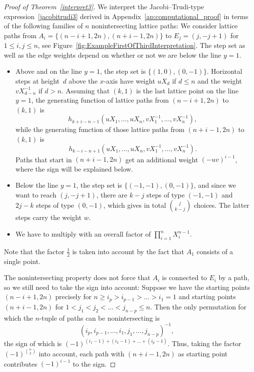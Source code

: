\documentclass[12pt]{amsart}
\theoremstyle{definition}
\numberwithin{equation}{section}
\begin{document}
\begin{proof}[Proof of Theorem~\ref{interpret3}]
	
	We interpret the Jacobi--Trudi-type expression~\eqref{jacobitrudi3} derived in Appendix~\ref{ap:computational_proof} in terms of the following families of $n$ nonintersecting lattice paths: We consider lattice paths from $A_i=\{(n-i+1,2n),(n+i-1,2n)\}$ to $E_j=(j,-j+1)$ for $1 \le i,j \le n$, see Figure~\ref{fig:ExampleFirstOfThirdInterpretation}. The step set as well as the edge weights depend on whether or not we are below the line $y=1$. 
	\begin{itemize} 
		\item Above and on the line $y=1$, the step set is $\{(1,0),(0,-1)\}$. Horizontal steps at height~$d$ above the $x$-axis have weight $u X_d$ if $d \le n$ and the weight $v X_{d-n}^{-1}$ if $d>n$. Assuming that $(k,1)$ is the last lattice point on the line $y=1$, the generating function of lattice paths from 
		$(n-i+1,2n)$ to $(k,1)$ is 
		\begin{equation*}
			h_{k+i-n-1}(u X_1,\ldots,u X_n,v X_1^{-1},\ldots,v X_n^{-1}),
		\end{equation*} 
		while the generating function of those lattice paths from $(n+i-1,2n)$ to $(k,1)$ is 
		\begin{equation*}
			h_{k-i-n+1}(u X_1,\ldots,u X_n,v X_1^{-1},\ldots,v X_n^{-1}).
		\end{equation*}
		Paths that start in $(n+i-1,2n)$ get an additional weight $(-uv)^{i-1}$, where the sign will be explained below.
		\item Below the line $y=1$, the step set is $\{(-1,-1),(0,-1)\}$, and since we want to reach $(j,-j+1)$, there are $k-j$ steps of type $(-1,-1)$ and $2j-k$ steps of type $(0,-1)$, which gives in total $\binom{j}{k-j}$ choices. The latter steps carry the weight $w$. 
		\item We have to multiply with an overall factor of $\prod_{i=1}^{n} X_i^{n-1}$.
	\end{itemize} 
	Note that the factor $\frac{1}{2}$ is taken into account by the fact that $A_1$ consists of a single point.
	
	The nonintersecting property does not force that $A_i$ is connected to $E_i$ by a path, so we still need to take the sign into account: Suppose we have the starting points $(n-i+1,2n)$ precisely for $n \ge i_p > i_{p-1} > \ldots > i_1=1$ and starting points $(n+i-1,2n)$ for $1 < j_1 < j_2 < \ldots < j_{n-p} \le n$. Then the only permutation for which the $n$-tuple of paths can be nonintersecting is
	\begin{equation*}
		(i_p,i_{p-1},\ldots,i_1,j_1,\ldots,j_{n-p})^{-1},
	\end{equation*}
	the sign of which is 
	$(-1)^{(i_1-1)+(i_2-1)+\ldots+(i_p-1)}$. Thus, taking the factor $(-1)^{\binom{n}{2}}$ into account, each path with $(n+i-1,2n)$ as starting point contributes $(-1)^{i-1}$ to the sign.
\end{proof}
\end{document}

